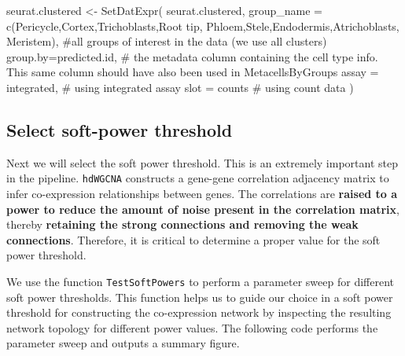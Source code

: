 \documentclass[
  letterpaper,
  DIV=11,
  numbers=noendperiod]{scrartcl}
\newenvironment{Shaded}{\begin{snugshade}}{\end{snugshade}}
\newcommand{\AttributeTok}[1]{\textcolor[rgb]{0.40,0.45,0.13}{#1}}
\newcommand{\CommentTok}[1]{\textcolor[rgb]{0.37,0.37,0.37}{#1}}
\newcommand{\FunctionTok}[1]{\textcolor[rgb]{0.28,0.35,0.67}{#1}}
\newcommand{\NormalTok}[1]{\textcolor[rgb]{0.00,0.23,0.31}{#1}}
\newcommand{\OtherTok}[1]{\textcolor[rgb]{0.00,0.23,0.31}{#1}}
\newcommand{\StringTok}[1]{\textcolor[rgb]{0.13,0.47,0.30}{#1}}
\begin{document}
\begin{Shaded}
\begin{Highlighting}[]
\NormalTok{seurat.clustered }\OtherTok{\textless{}{-}} \FunctionTok{SetDatExpr}\NormalTok{(}
\NormalTok{  seurat.clustered,}
  \AttributeTok{group\_name =} \FunctionTok{c}\NormalTok{(}\StringTok{\textquotesingle{}Pericycle\textquotesingle{}}\NormalTok{,}\StringTok{\textquotesingle{}Cortex\textquotesingle{}}\NormalTok{,}\StringTok{\textquotesingle{}Trichoblasts\textquotesingle{}}\NormalTok{,}\StringTok{\textquotesingle{}Root tip\textquotesingle{}}\NormalTok{,}
                 \StringTok{\textquotesingle{}Phloem\textquotesingle{}}\NormalTok{,}\StringTok{\textquotesingle{}Stele\textquotesingle{}}\NormalTok{,}\StringTok{\textquotesingle{}Endodermis\textquotesingle{}}\NormalTok{,}\StringTok{\textquotesingle{}Atrichoblasts\textquotesingle{}}\NormalTok{,}
                 \StringTok{\textquotesingle{}Meristem\textquotesingle{}}\NormalTok{), }\CommentTok{\#all groups of interest in the data (we use all clusters)}
  \AttributeTok{group.by=}\StringTok{\textquotesingle{}predicted.id\textquotesingle{}}\NormalTok{, }\CommentTok{\# the metadata column containing the cell type info. This same column should have also been used in MetacellsByGroups}
  \AttributeTok{assay =} \StringTok{\textquotesingle{}integrated\textquotesingle{}}\NormalTok{, }\CommentTok{\# using integrated assay}
  \AttributeTok{slot =} \StringTok{\textquotesingle{}counts\textquotesingle{}} \CommentTok{\# using count data}
\NormalTok{)}
\end{Highlighting}
\end{Shaded}

\subsection{Select soft-power
threshold}\label{select-soft-power-threshold}

Next we will select the soft power threshold. This is an extremely
important step in the pipeline. \texttt{hdWGCNA} constructs a gene-gene
correlation adjacency matrix to infer co-expression relationships
between genes. The correlations are \textbf{raised to a power to reduce
the amount of noise present in the correlation matrix}, thereby
\textbf{retaining the strong connections and removing the weak
connections}. Therefore, it is critical to determine a proper value for
the soft power threshold.

We use the function \texttt{TestSoftPowers} to perform a parameter sweep
for different soft power thresholds. This function helps us to guide our
choice in a soft power threshold for constructing the co-expression
network by inspecting the resulting network topology for different power
values. The following code performs the parameter sweep and outputs a
summary figure.
\end{document}

